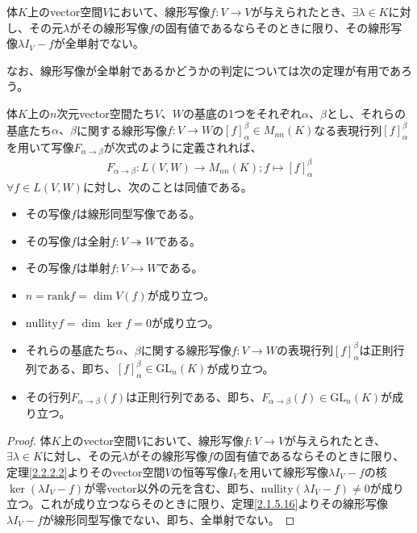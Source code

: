 \documentclass[dvipdfmx]{jsarticle}
\begin{document}
\begin{thm}\label{2.2.2.3}
体$K$上のvector空間$V$において、線形写像$f:V \rightarrow V$が与えられたとき、$\exists\lambda \in K$に対し、その元$\lambda$がその線形写像$f$の固有値であるならそのときに限り、その線形写像$\lambda I_{V} - f$が全単射でない。
\end{thm}\par
なお、線形写像が全単射であるかどうかの判定については次の定理が有用であろう。
\begin{thm*}
体$K$上の$n$次元vector空間たち$V$、$W$の基底の1つをそれぞれ$\alpha$、$\beta$とし、それらの基底たち$\alpha 、\beta$に関する線形写像$f:V \rightarrow W$の$[ f]^{\beta}_{\alpha} \in M_{nn}(K)$なる表現行列$[ f]^{\beta}_{\alpha}$を用いて写像$F_{\alpha \rightarrow \beta}$が次式のように定義されれば、
\begin{align*}
F_{\alpha \rightarrow \beta}:L(V,W) \rightarrow M_{nn}(K);f \mapsto [ f]^{\beta}_{\alpha}
\end{align*}
$\forall f \in L(V,W)$に対し、次のことは同値である。
\begin{itemize}
\item
  その写像$f$は線形同型写像である。
\item
  その写像$f$は全射$f:V \twoheadrightarrow W$である。
\item
  その写像$f$は単射$f:V \rightarrowtail W$である。
\item
  $n = {\mathrm{rank} }f = \dim{V(f)}$が成り立つ。
\item
  ${\mathrm{nullity} }f = \dim{\ker f} = 0$が成り立つ。
\item
  それらの基底たち$\alpha$、$\beta$に関する線形写像$f:V \rightarrow W$の表現行列$[ f]^{\beta}_{\alpha}$は正則行列である、即ち、$[ f]^{\beta}_{\alpha} \in {\mathrm{GL} }_{n}(K)$が成り立つ。
\item
  その行列$F_{\alpha \rightarrow \beta}(f)$は正則行列である、即ち、$F_{\alpha \rightarrow \beta}(f) \in {\mathrm{GL} }_{n}(K)$が成り立つ。
\end{itemize}
\end{thm*}
\begin{proof}
体$K$上のvector空間$V$において、線形写像$f:V \rightarrow V$が与えられたとき、$\exists\lambda \in K$に対し、その元$\lambda$がその線形写像$f$の固有値であるならそのときに限り、定理\ref{2.2.2.2}よりそのvector空間$V$の恒等写像$I_{V}$を用いて線形写像$\lambda I_{V} - f$の核$\ker\left( \lambda I_{V} - f \right)$が零vector以外の元を含む、即ち、${\mathrm{nullity} }\left( \lambda I_{V} - f \right) \neq 0$が成り立つ。これが成り立つならそのときに限り、定理\ref{2.1.5.16}よりその線形写像$\lambda I_{V} - f$が線形同型写像でない、即ち、全単射でない。
\end{proof}
\end{document}
